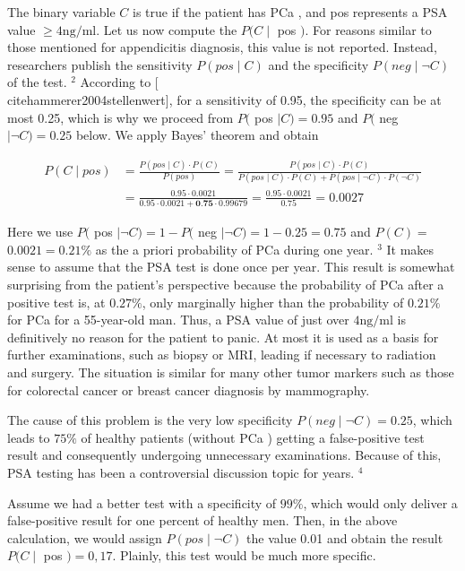 \documentclass[10pt]{book}
\begin{document}
The binary variable $C$ is true if the patient has PCa , and pos represents a PSA value $\geq 4 \mathrm{ng} / \mathrm{ml}$. Let us now compute the $P(C \mid$ pos $)$. For reasons similar to those mentioned for appendicitis diagnosis, this value is not reported. Instead, researchers publish the sensitivity $P(p o s \mid C)$ and the specificity $P(n e g \mid \neg C)$ of the test. ${ }^{2}$ According to [\\cite{hammerer2004stellenwert}], for a sensitivity of 0.95, the specificity can be at most 0.25, which is why we proceed from $P($ pos $\mid C)=0.95$ and $P($ neg $\mid \neg C)=0.25$ below. We apply Bayes' theorem and obtain


$$
\begin{aligned}
P(C \mid p o s) & =\frac{P(p o s \mid C) \cdot P(C)}{P(p o s)}=\frac{P(p o s \mid C) \cdot P(C)}{P(p o s \mid C) \cdot P(C)+P(p o s \mid \neg C) \cdot P(\neg C)} \\
& =\frac{0.95 \cdot 0.0021}{0.95 \cdot 0.0021+\mathbf{0 . 7 5} \cdot 0.99679}=\frac{0.95 \cdot 0.0021}{0.75}=0.0027
\end{aligned}
$$

Here we use $P($ pos $\mid \neg C)=1-P($ neg $\mid \neg C)=1-0.25=0.75$ and $P(C)=$ $0.0021=0.21 \%$ as the a priori probability of PCa during one year. ${ }^{3}$ It makes sense to assume that the PSA test is done once per year. This result is somewhat surprising from the patient's perspective because the probability of PCa after a positive test is, at $0.27 \%$, only marginally higher than the probability of $0.21 \%$ for PCa for a 55-year-old man. Thus, a PSA value of just over $4 \mathrm{ng} / \mathrm{ml}$ is definitively no reason for the patient to panic. At most it is used as a basis for further examinations, such as biopsy or MRI, leading if necessary to radiation and surgery. The situation is similar for many other tumor markers such as those for colorectal cancer or breast cancer diagnosis by mammography.

The cause of this problem is the very low specificity $P(n e g \mid \neg C)=0.25$, which leads to $75 \%$ of healthy patients (without PCa ) getting a false-positive test result and consequently undergoing unnecessary examinations. Because of this, PSA testing has been a controversial discussion topic for years. ${ }^{4}$

Assume we had a better test with a specificity of $99 \%$, which would only deliver a false-positive result for one percent of healthy men. Then, in the above calculation, we would assign $P(p o s \mid \neg C)$ the value 0.01 and obtain the result $P(C \mid$ pos $)=0,17$. Plainly, this test would be much more specific.
\end{document}
